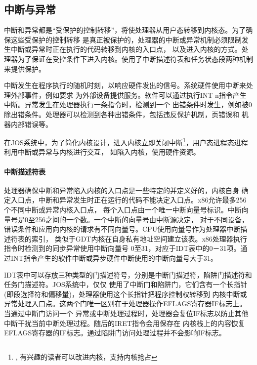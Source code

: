 \documentclass[12pt,openany,a4paper]{report}
\begin{document}
	\subsection{中断与异常}
	    中断和异常都是“受保护的控制转移”，将使处理器从用户态转移到内核态。为了确保这些受保护的控制转移
	是真正被保护的，处理器的中断或异常机制必须限制发生中断或异常时正在执行的代码转移到内核的入口点，
	以及进入内核的方式。处理器为了保证在受控条件下进入内核。使用了中断描述符表和任务状态段两种机制
	来提供保护。\par
	    中断发生在程序执行的随机时刻，以响应硬件发出的信号。系统硬件使用中断来处理外部事件，例如要求
	为外部设备提供服务。软件可以通过执行INT n指令产生中断。异常发生在处理器执行一条指令时，检测到一个
	出错条件时发生，例如被0除出错条件。处理器可以检测到各种出错条件，包括违反保护机制，页错误和
	机器内部错误等。\par
	    在JOS系统中，为了简化内核设计，进入内核立即关闭中断\footnote{,
	有兴趣的读者可以改进内核，支持内核抢占}，用户态进程态进程利用中断或异常与内核进行交互，
	如陷入内核，使用硬件资源。\par
	\paragraph{中断描述符表}
	    处理器确保中断和异常陷入内核的入口点是一些特定的并定义好的，内核自身
	确定入口点，中断和异常发生时正在运行的代码不能决定入口点。x86允许最多256个不同中断或异常内核入口点，
	每个入口点由一个唯一中断向量号标识。中断向量号是0至256之间的一个数。一个中断的向量号由中断源决定，
	对于不同设备，错误条件和应用向内核的请求有不同向量号。CPU使用向量号作为处理器中断描述符表的索引，
	类似于GDT内核在自身私有地址空间建立该表。x86处理器执行指令时检测到的同步异常使用中断向量号
	0至31，对应于IDT表中的0－31项。通过INT指令产生的软件中断或异步硬件中断使用的中断向量号大于31。\par
	    IDT表中可以存放三种类型的门描述符号，分别是中断门描述符，陷阱门描述符和任务门描述符。JOS系统中，仅仅
	使用了中断门和陷阱门，它们含有一个长指针(即段选择符和偏移量)，处理器使用这个长指针把程序控制权转移到
	内核中断或异常处理入口点。这两个门唯一区别在于处理器操作EFLAGS寄存器IF标志上。当通过中断门访问一个
	异常或中断处理过程时，处理器会复位IF标志以防止其他中断干扰当前中断处理过程。随后的IRET指令会用保存在
	内核栈上的内容恢复EFLAGS寄存器的IF标志。通过陷阱门访问处理过程并不会影响IF标志。\par
\end{document}
